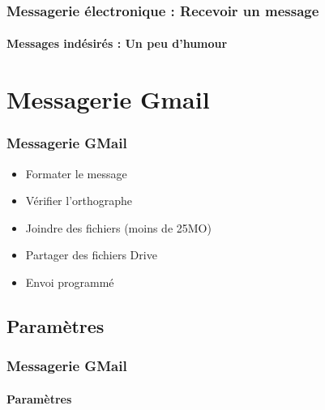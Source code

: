 \documentclass[xcolor=table]{beamer}
\begin{document}
\begin{frame}
\frametitle{Messagerie électronique : Recevoir un message}
\framesubtitle{Messages indésirés : Un peu d'humour}

\begin{center}
\end{center}

\end{frame}


\section{Messagerie Gmail}

\begin{frame}
\frametitle{Messagerie GMail}

\begin{minipage}{0.48\textwidth}
	\begin{itemize}
		\item Formater le message
		\item Vérifier l'orthographe
		\item Joindre des fichiers (moins de 25MO)
		\item Partager des fichiers Drive
		\item Envoi programmé
	\end{itemize}
\end{minipage}
\begin{minipage}{0.48\textwidth}
\end{minipage}

\end{frame}

\subsection{Paramètres}

\begin{frame}
\frametitle{Messagerie GMail}
\framesubtitle{Paramètres}

\begin{center}
\end{center}

\end{frame}
\end{document}
